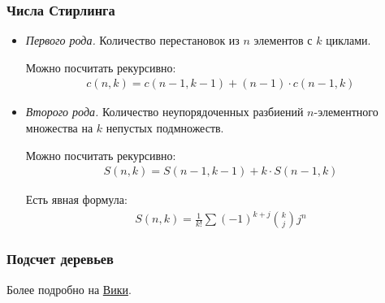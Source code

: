 \subsubsection{Числа Стирлинга}
\begin{itemize}
	\item \textit{Первого рода.} Количество перестановок из $n$ элементов с $k$ циклами.
	
	Можно посчитать рекурсивно:
	\begin{align*}
		c(n, k) = c(n - 1, k - 1) + (n - 1)\cdot c(n - 1, k)
	\end{align*} 
	\item \textit{Второго рода.} Количество неупорядоченных разбиений $n$-элементного множества на $k$ непустых подмножеств.
	
	Можно посчитать рекурсивно:
	\begin{align*}
		S(n, k) = S(n - 1, k - 1) + k\cdot S(n - 1, k)
	\end{align*}
	
	Есть явная формула:
	\begin{align*}
		S(n, k) = \frac{1}{k!}\sum\limits(-1)^{k + j}{k \choose j}j^n
	\end{align*}
\end{itemize}

\subsubsection{Подсчет деревьев}

Более подробно на \href{https://ru.wikipedia.org/wiki/%D0%A7%D0%B8%D1%81%D0%BB%D0%B0_%D0%9A%D0%B0%D1%82%D0%B0%D0%BB%D0%B0%D0%BD%D0%B0}{Вики}.


